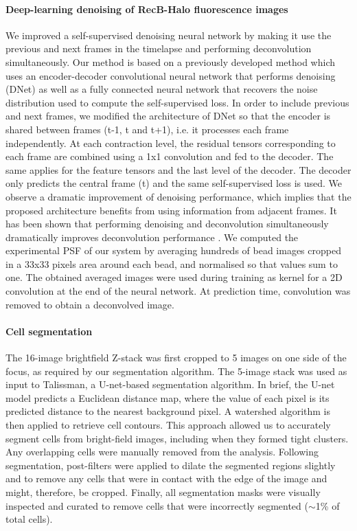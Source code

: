 \paragraph*{Deep-learning denoising of RecB-Halo fluorescence images}
We improved a self-supervised denoising neural network by making it use the previous and next frames in the timelapse and performing deconvolution simultaneously. Our method is based on a previously developed method \cite{Ollion2021} which uses an encoder-decoder convolutional neural network that performs denoising (DNet) as well as a fully connected neural network that recovers the noise distribution used to compute the self-supervised loss. In order to include previous and next frames, we modified the architecture of DNet so that the encoder is shared between frames (t-1, t and t+1), i.e. it processes each frame independently. At each contraction level, the residual tensors corresponding to each frame are combined using a 1x1 convolution and fed to the decoder. The same applies for the feature tensors and the last level of the decoder. The decoder only predicts the central frame (t) and the same self-supervised loss is used. We observe a dramatic improvement of denoising performance, which implies that the proposed architecture benefits from using information from adjacent frames. It has been shown that performing denoising and deconvolution simultaneously dramatically improves deconvolution performance \cite{Kobayashi2020}. We computed the experimental PSF of our system by averaging hundreds of bead images cropped in a 33x33 pixels area around each bead, and normalised so that values sum to one. The obtained averaged images were used during training as kernel for a 2D convolution at the end of the neural network. At prediction time, convolution was removed to obtain a deconvolved image.

\paragraph{Cell segmentation}
The 16-image brightfield Z-stack was first cropped to 5 images on one side of the focus, as required by our segmentation algorithm. The 5-image stack was used as input to Talissman, a U-net-based segmentation algorithm. In brief, the U-net model predicts a Euclidean distance map, where the value of each pixel is its predicted distance to the nearest background pixel. A watershed algorithm is then applied to retrieve cell contours. This approach allowed us to accurately segment cells from bright-field images, including when they formed tight clusters. Any overlapping cells were manually removed from the analysis. Following segmentation, post-filters were applied to dilate the segmented regions slightly and to remove any cells that were in contact with the edge of the image and might, therefore, be cropped. Finally, all segmentation masks were visually inspected and curated to remove cells that were incorrectly segmented ($\sim$1\% of total cells).

